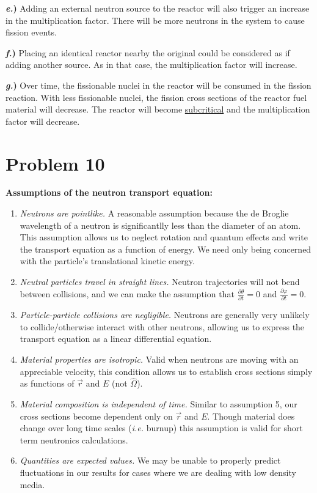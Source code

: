 \documentclass{article}
\newcommand{\Oh}{\hat{\Omega}}
\begin{document}
\textbf{\textit{e.})} Adding an external neutron source to the reactor will also trigger an increase in the multiplication factor. There will be more neutrons in the system to cause fission events.

\textbf{\textit{f.})} Placing an identical reactor nearby the original could be considered as if adding another source. As in that case, the multiplication factor will increase.

\textbf{\textit{g.})} Over time, the fissionable nuclei in the reactor will be consumed in the fission reaction. With less fissionable nuclei, the fission cross sections of the reactor fuel material will decrease. The reactor will become \underline{subcritical} and the multiplication factor will decrease.




\section*{Problem 10}

\textbf{Assumptions of the neutron transport equation:}
\begin{enumerate}
	\item \textit{Neutrons are pointlike.} A reasonable assumption because the de Broglie wavelength of a neutron is significantlly less than the diameter of an atom. This assumption allows us to neglect rotation and quantum effects and write the transport equation as a function of energy. We need only being concerned with the particle's translational kinetic energy.
	\item \textit{Neutral particles travel in straight lines.} Neutron trajectories will not bend between collisions, and we can make the assumption that $\frac{\partial \theta}{\partial t} = 0$ and $\frac{\partial \varphi}{\partial t} = 0$.
	\item \textit{Particle-particle collisions are negligible.} Neutrons are generally very unlikely to collide/otherwise interact with other neutrons, allowing us to express the transport equation as a linear differential equation.
	\item \textit{Material properties are isotropic.} Valid when neutrons are moving with an appreciable velocity, this condition allows us to establish cross sections simply as functions of $\vec{r}$ and $E$ (not $\Oh$).
	\item \textit{Material composition is independent of time.} Similar to assumption 5, our cross sections become dependent only on $\vec{r}$ and $E$. Though material does change over long time scales (\textit{i.e.} burnup) this assumption is valid for short term neutronics calculations.
	\item \textit{Quantities are expected values.} We may be unable to properly predict fluctuations in our results for cases where we are dealing with low density media.

\end{enumerate}
\end{document}
